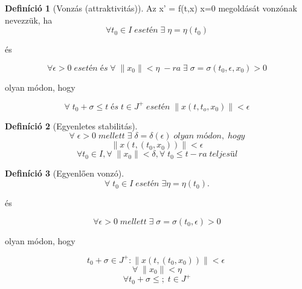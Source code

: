 \documentclass{article}
\theoremstyle{definition}
\theoremstyle{theorem}
\newtheorem{definition}{Definíció}
\begin{document}
\begin{definition}[Vonzás (attraktivitás)]
Az x' = f(t,x) x=0 megoldását vonzónak nevezzük, ha
\begin{equation*}
    \forall t_0 \in I \; esetén\; \exists\; \eta = \eta(t_0)
\end{equation*}
\begin{center}
    és
\end{center}
\begin{equation*}
    \forall \epsilon > 0\; esetén \;és\; \forall \; \lVert x_0 \rVert < \eta \;-ra \; \exists \; \sigma = \sigma(t_0,\epsilon,x_0) > 0
\end{equation*}
\begin{center}
    olyan módon, hogy
\end{center}
\begin{equation*}
    \forall \; t_0 + \sigma \leq t \;és\; t \in J^+ \;esetén \; \lVert x(t,t_o,x_0) \rVert < \epsilon
\end{equation*}
\end{definition}
\begin{definition}[Egyenletes stabilitás]
\begin{equation*}
    \forall \; \epsilon > 0 \; mellett \; \exists \; \delta  = \delta(\epsilon) \;olyan \;módon,\;hogy
\end{equation*}
\begin{equation*}
    \lVert x(t,(t_0,x_0)) \rVert < \epsilon
\end{equation*}
\begin{equation*}
    \forall t_0 \in I, \forall \; \lVert x_0 \rVert < \delta,
    \forall \; t_0 \leq t-ra \;teljesül
\end{equation*}
\end{definition}

\begin{definition}[Egyenlően vonzó]
\begin{equation*}
    \forall \; t_0 \in I \; esetén \; \exists \eta = \eta(t_0).
\end{equation*}
\begin{center}
    és
\end{center}
\begin{equation*}
    \forall \epsilon > 0 \; mellett \; \exists \; \sigma = \sigma(t_0,\epsilon) > 0
\end{equation*}
\begin{center}
    olyan módon, hogy
\end{center}
\begin{equation*}
    t_0 + \sigma \in J^+ : \lVert x(t,(t_0,x_0)) \rVert < \epsilon
    \;
\end{equation*}
\begin{equation*}
     \forall \; \lVert x_0 \rVert < \eta
\end{equation*}
\begin{equation*}
     \forall t_0 + \sigma \leq ; \; t \in J^+
\end{equation*}
\end{definition}
\end{document}
